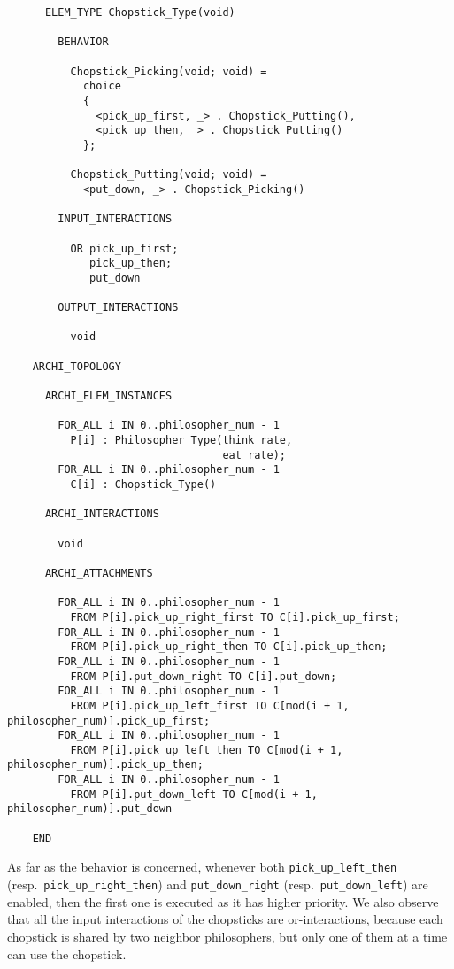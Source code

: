 \begin{verbatim}
      ELEM_TYPE Chopstick_Type(void)

        BEHAVIOR

          Chopstick_Picking(void; void) =
            choice
            {
              <pick_up_first, _> . Chopstick_Putting(),
              <pick_up_then, _> . Chopstick_Putting()
            };

          Chopstick_Putting(void; void) =
            <put_down, _> . Chopstick_Picking()

        INPUT_INTERACTIONS

          OR pick_up_first;
             pick_up_then;
             put_down

        OUTPUT_INTERACTIONS

          void

    ARCHI_TOPOLOGY

      ARCHI_ELEM_INSTANCES

        FOR_ALL i IN 0..philosopher_num - 1
          P[i] : Philosopher_Type(think_rate,
                                  eat_rate);
        FOR_ALL i IN 0..philosopher_num - 1
          C[i] : Chopstick_Type()

      ARCHI_INTERACTIONS

        void

      ARCHI_ATTACHMENTS

        FOR_ALL i IN 0..philosopher_num - 1
          FROM P[i].pick_up_right_first TO C[i].pick_up_first;
        FOR_ALL i IN 0..philosopher_num - 1
          FROM P[i].pick_up_right_then TO C[i].pick_up_then;
        FOR_ALL i IN 0..philosopher_num - 1
          FROM P[i].put_down_right TO C[i].put_down;
        FOR_ALL i IN 0..philosopher_num - 1
          FROM P[i].pick_up_left_first TO C[mod(i + 1, philosopher_num)].pick_up_first;
        FOR_ALL i IN 0..philosopher_num - 1
          FROM P[i].pick_up_left_then TO C[mod(i + 1, philosopher_num)].pick_up_then;
        FOR_ALL i IN 0..philosopher_num - 1
          FROM P[i].put_down_left TO C[mod(i + 1, philosopher_num)].put_down

    END
	\end{verbatim}

As far as the behavior is concerned, whenever both {\tt pick\_up\_left\_then} (resp.\
{\tt pick\_up\_right\_then}) and {\tt put\_down\_right} (resp.\ {\tt put\_down\_left}) are enabled, then the
first one is executed as it has higher priority. We also observe that all the input interactions of the
chopsticks are or-interactions, because each chopstick is shared by two neighbor philosophers, but only one
of them at a time can use the chopstick.

